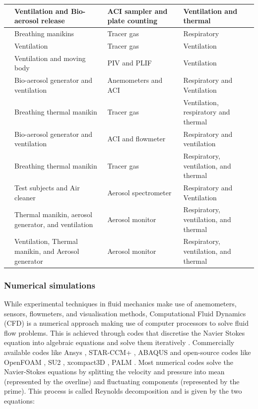 \documentclass[a4paper,12pt]{elsarticle}
\begin{document}
\begin{longtable}{|m{3.55cm}|m{3.5cm}|m{3.5cm}|m{3.5cm}|}
    \hline
    \citet{liu2020experimental}& Ventilation and Bio-aerosol release & ACI sampler and plate counting & Ventilation and thermal \\
    \hline
    \citet{qian2008dispersion}& Breathing manikins & Tracer gas & Respiratory\\
    \hline
    \citet{lu2020reducing}& Ventilation & Tracer gas & Ventilation\\
    \hline
    \citet{poussou2010flow}& Ventilation and moving body & PIV and PLIF & Ventilation \\
    \hline
    \citet{liu2020full}& Bio-aerosol generator and ventilation & Anemometers and ACI & Respiratory and Ventilation \\
    \hline
    \citet{cheng2021experimental}& Breathing thermal manikin & Tracer gas & Ventilation, respiratory and thermal\\
    \hline
    \citet{liu2023estimating}& Bio-aerosol generator and ventilation & ACI and flowmeter & Respiratory and ventilation \\
    \hline
    \citet{li2021effects}& Breathing thermal manikin & Tracer gas & Respiratory, ventilation, and thermal\\
    \hline
    \citet{duill2021impact}& Test subjects and Air cleaner &  Aerosol spectrometer & Respiratory and Ventilation\\
    \hline
    \citet{zhou2021experimental}& Thermal manikin, aerosol generator, and ventilation  & Aerosol monitor & Respiratory, ventilation, and thermal \\
    \hline
    \citet{zhang2019distribution}& Ventilation, Thermal manikin, and Aerosol generator & Aerosol monitor & Respiratory, ventilation, and thermal\\
    \hline
\end{longtable}

\subsubsection{Numerical simulations}

While experimental techniques in fluid mechanics make use of anemometers, sensors, flowmeters, and visualisation methods, Computational Fluid Dynamics (CFD) is a numerical approach making use of computer processors to solve fluid flow problems. This is achieved through codes that discretise the Navier Stokes equation into algebraic equations and solve them iteratively \cite{ferziger2002computational}. Commercially available codes like Ansys \cite{ANSYS}, STAR-CCM+ \cite{starccm}, ABAQUS \cite{abaqus} and open-source codes like OpenFOAM \cite{openfoam}, SU2 \cite{su2}, xcompact3D \cite{xcompact3d}, PALM \cite{palm}. Most numerical codes solve the Navier-Stokes equations by splitting the velocity and pressure into mean (represented by the overline) and fluctuating components (represented by the prime). This process is called Reynolds decomposition and is given by the two equations:
\end{document}
